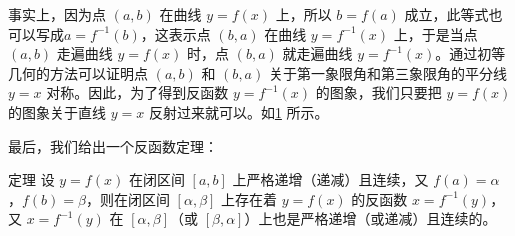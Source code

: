 事实上，因为点 $(a,b)$ 在曲线 $y=f(x)$ 上，所以 $b=f(a)$ 成立，此等式也可以写成$a=f^{-1}(b)$，这表示点 $(b,a)$ 在曲线 $y=f^{-1}(x)$ 上，于是当点 $(a,b)$ 走遍曲线 $y=f(x)$ 时，点 $(b,a)$ 就走遍曲线 $y=f^{-1}(x)$。通过初等几何的方法可以证明点 $(a,b)$ 和 $(b,a)$ 关于第一象限角和第三象限角的平分线 $y=x$ 对称。因此，为了得到反函数 $y=f^{-1}(x)$ 的图象，我们只要把 $y=f(x)$ 的图象关于直线 $y=x$ 反射过来就可以。如\cref{fig:inverse_func_graph} 所示。
\begin{figure}
    \caption{}\label{fig:inverse_func_graph}
\end{figure}

最后，我们给出一个反函数定理：

\begin{Theorem}{定理}
设 $y=f(x)$ 在闭区间 $[a,b]$ 上严格递增（递减）且连续，又 $f(a)=\alpha$，$f(b)=\beta$，则在闭区间 $[\alpha,\beta]$ 上存在着 $y=f(x)$ 的反函数 $x=f^{-1}(y)$，又 $x=f^{-1}(y)$ 在 $[\alpha,\beta]$（或 $[\beta,\alpha]$）上也是严格递增（或递减）且连续的。
\end{Theorem}

